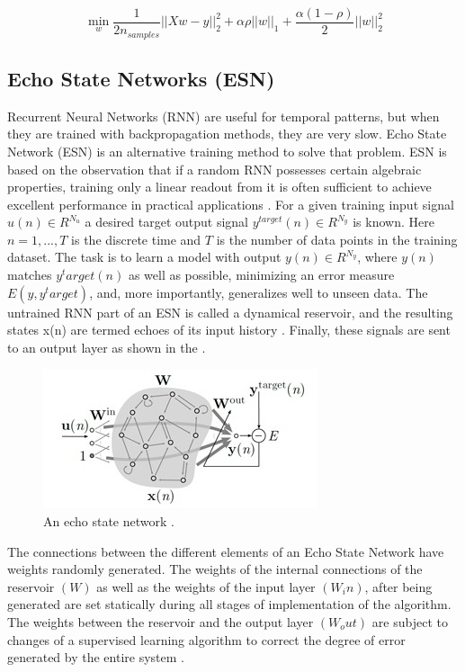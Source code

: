 $$\min_{w} { \frac{1}{2n_{samples}} \Bigr| \Bigr| Xw - y \Bigr| \Bigr|_2^2  + \alpha \rho \Bigr| \Bigr| w \Bigr| \Bigr|_1 + \frac{\alpha (1- \rho)}{2} \Bigr| \Bigr| w \Bigr| \Bigr|_2^2 } $$

\subsection{Echo State Networks (ESN)}
Recurrent Neural Networks (RNN) are useful for temporal patterns, but when they are trained with backpropagation methods, they are very slow.  Echo State Network (ESN) is an alternative training method to solve that problem.  ESN is based on the observation that if a random RNN possesses certain algebraic properties, training only a linear readout from it is often sufficient to achieve excellent performance in practical applications \citep{Lukose2009}. 
For a given training input signal $u(n)  \in R^{N_u}$ a desired target output signal $y^{target}(n) \in R^{N_y}$
is known. Here $n = 1, . . . ,T$ is the discrete time and $T$ is the number of data points in the training dataset. The task is to learn a model with output $y(n) \in R^{N_y}$, where $y(n)$ matches $y^target(n)$ as well as possible, minimizing an error measure $E(y,y^target)$, and, more importantly, generalizes well to unseen data. The untrained RNN part of an ESN is called a dynamical reservoir, and the resulting states x(n) are termed echoes of its input history \citep{Lukose2012}. Finally, these signals are sent to an output layer as shown in the .
\begin{figure}[h] 
 \centering
 \includegraphics[scale=.9]{Reservorio}
 \caption{An echo state network \citep{Lukose2012}.} 
 \label{figura3} 
\end{figure}
 
The connections between the different elements of an Echo State Network have weights randomly generated. The weights of the internal connections of the reservoir $(W)$ as well as the weights of the input layer $(W_in)$, after being generated are set statically during all stages of implementation of the algorithm. The weights between the reservoir and the output layer $(W_out)$ are subject to changes of a supervised learning algorithm to correct the degree of error generated by the entire system \citep{Lukose2012}.

